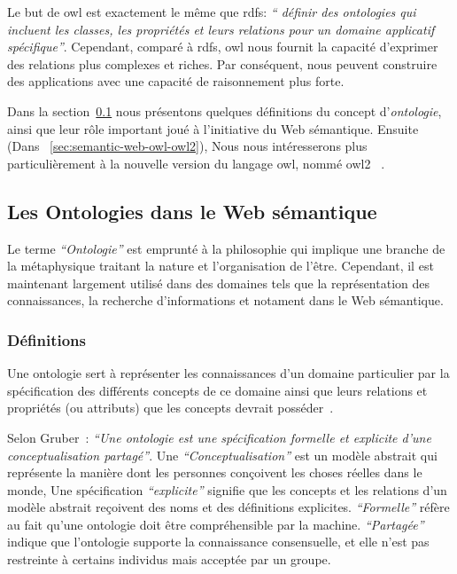 Le but de \acrshort{owl} est exactement le même que \acrshort{rdfs}:
\emph{`` définir des ontologies qui incluent les classes, les
  propriétés et leurs relations pour un domaine applicatif
  spécifique''}. Cependant, comparé à \acrshort{rdfs}, \acrshort{owl}
nous fournit la capacité d'exprimer des relations plus complexes et
riches. Par conséquent, nous peuvent construire des applications avec
une capacité de raisonnement plus forte.\medskip

Dans la section~\ref{sec:semantic-web-owl-ontolgies} nous présentons
quelques définitions du concept d'\emph{ontologie}, ainsi que leur
rôle important joué à l'initiative du Web sémantique. Ensuite (Dans
~\ref{sec:semantic-web-owl-owl2}), Nous nous intéresserons plus
particulièrement à la nouvelle version du langage \acrshort{owl},
nommé \acrshort{owl2}~\cite{w3c2009owl} .

\subsection{Les Ontologies dans le Web sémantique}
\label{sec:semantic-web-owl-ontolgies}

Le terme \emph{``Ontologie''} est emprunté à la philosophie qui
implique une branche de la métaphysique traitant la nature et
l’organisation de l'être. Cependant, il est maintenant largement
utilisé dans des domaines tels que la représentation des
connaissances, la recherche d'informations et notament dans le Web
sémantique.

\subsubsection{Définitions}
\label{sec:semantic-web-owl-ontolgies-defs}

Une ontologie sert à représenter les connaissances d'un domaine
particulier par la spécification des différents concepts de ce domaine
ainsi que leurs relations et propriétés (ou attributs) que les
concepts devrait posséder~\cite{mcguinness2004owl}.\medskip

Selon Gruber~\cite{gruber1993translation}: \emph{``Une ontologie est
  une spécification formelle et explicite d'une conceptualisation
  partagé''}. Une \emph{``Conceptualisation''} est un modèle abstrait
qui représente la manière dont les personnes conçoivent les choses
réelles dans le monde, Une spécification \emph{``explicite''} signifie
que les concepts et les relations d'un modèle abstrait reçoivent des
noms et des définitions explicites. \emph{``Formelle''} réfère au fait
qu'une ontologie doit être compréhensible par la
machine. \emph{``Partagée''} indique que l'ontologie supporte la
connaissance consensuelle, et elle n'est pas restreinte à certains
individus mais acceptée par un groupe.\medskip

